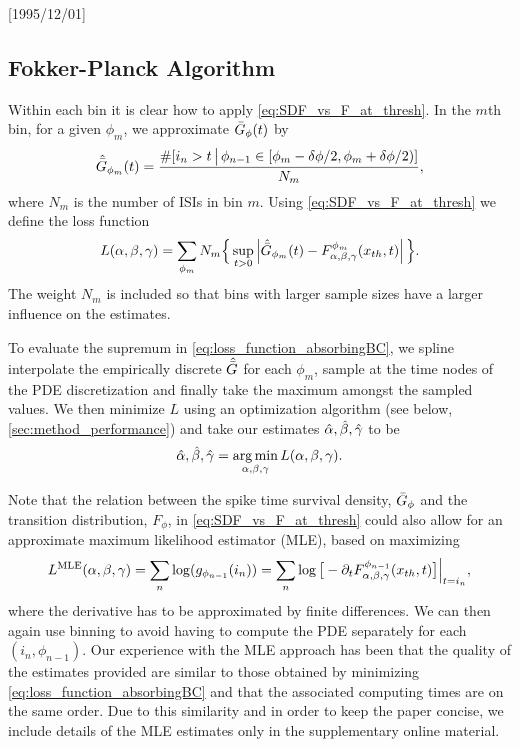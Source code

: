 \NeedsTeXFormat{LaTeX2e}[1995/12/01] \documentclass[10pt]{bmc_article}
\newenvironment{bmcformat}{\begin{raggedright}\baselineskip20pt\sloppy\setboolean{publ}{false}}{\end{raggedright}\baselineskip20pt\sloppy}
\begin{document}
\begin{bmcformat}
\subsection{Fokker-Planck Algorithm}
Within each bin it is clear how to apply \cref{eq:SDF_vs_F_at_thresh}. In the
$m$th bin, for a given $\phi_m$, we approximate ${ \bar{G} }_{\phi}(t)$  by
\begin{equation}
{ \hat{{ \bar{G} }} }_{\phi_m}(t) =
 \frac{\#[i_n > t \, \big| \, \phi_{n-1} \in [\phi_m - { \delta \phi }/2,
\phi_m + { \delta \phi }/2) ]}{N_m},
\label{eq:SDF_estimate_per_bin}
\end{equation}
where $N_m$ is the number of ISIs in bin $m$. Using \cref{eq:SDF_vs_F_at_thresh}
we define the loss function
\begin{equation}
L({\alpha},{\beta},{\gamma }) = 
\sum_{\phi_m} N_m \Big\{ 
\sup_{t>0} \left| { \hat{{ \bar{G} }} }_{\phi_m}(t) - F^{\phi_m}_{{\alpha},{\beta},{\gamma }}({ x_{th} },
t) \right| \Big \}.
\label{eq:loss_function_absorbingBC}
\end{equation}
The weight $N_m$ is included so that bins with larger sample sizes have a
larger influence on the estimates. 
 
To evaluate the supremum in \cref{eq:loss_function_absorbingBC}, we
spline interpolate the empirically discrete ${ \hat{{ \bar{G} }} }$ for each $\phi_m$, sample at
the time nodes of the PDE discretization and 
finally take the maximum amongst the sampled values.
We then minimize $L$ using an optimization algorithm (see below,
\cref{sec:method_performance}) and take our estimates ${{{ \hat{{\alpha}} }, { \hat{{\beta}} }, { \hat{{\gamma }} }} }$ to be
$$
\abgest = \argmin_{\abg} L(\abg).
$$

Note that the relation between the spike time survival density, ${ \bar{G} }_{\phi}$ and
the transition distribution, $F_{\phi}$, in \cref{eq:SDF_vs_F_at_thresh} could
also allow for an approximate maximum likelihood estimator (MLE), based on
maximizing 
$$
L^{\textrm{MLE}}({\alpha},{\beta},{\gamma }) = \sum_n  \log ( g_{\phi_{n-1}}(i_n) )
= \sum_n \log \big[ -{\partial}_t F^{\phi_{n-1}}_{{\alpha},{\beta},{\gamma }}({ x_{th} }, t) \big] \Big|_{t =
i_n},
 $$ where the derivative has to be approximated by finite differences. We
can then again use binning to avoid having to compute the PDE separately for
each $(i_n, \phi_{n-1})$. Our experience with the MLE approach has been that the
quality of the estimates provided are similar to those obtained by minimizing
\cref{eq:loss_function_absorbingBC} and that the associated computing times are
on the same order. Due to this similarity and in order to keep the paper
concise, we include details of the MLE estimates only in the supplementary
online material.

\end{bmcformat}
\end{document}
